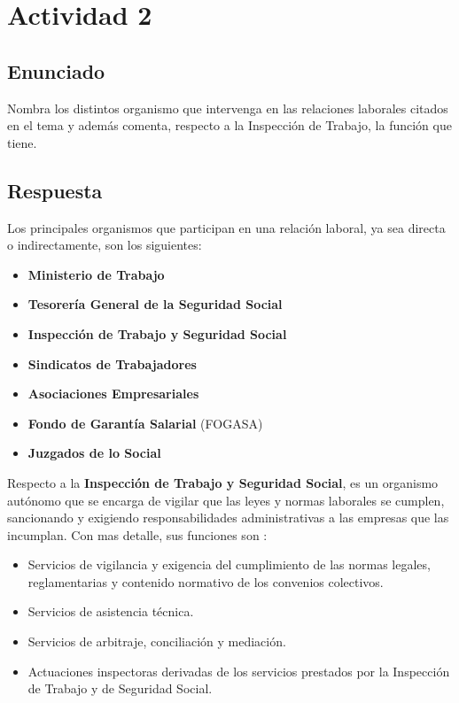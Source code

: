 \section{Actividad 2}

\subsection{Enunciado}
Nombra los distintos organismo que intervenga en las relaciones laborales citados en el tema y además comenta, respecto a la Inspección de Trabajo, la función que tiene.

\subsection{Respuesta}
Los principales organismos que participan en una relación laboral, ya sea directa o indirectamente, son los siguientes:

\begin{itemize}
    \item \textbf{Ministerio de Trabajo}
    \item \textbf{Tesorería General de la Seguridad Social}
    \item \textbf{Inspección de Trabajo y Seguridad Social}
    \item \textbf{Sindicatos de Trabajadores}
    \item \textbf{Asociaciones Empresariales}
    \item \textbf{Fondo de Garantía Salarial} (FOGASA)
    \item \textbf{Juzgados de lo Social}
\end{itemize}

Respecto a la \textbf{Inspección de Trabajo y Seguridad Social}, es un organismo autónomo que se encarga de vigilar que las leyes y normas laborales se cumplen, sancionando y exigiendo responsabilidades administrativas a las empresas que las incumplan. Con mas detalle, sus funciones son \cite{itss}:

\begin{itemize}
    \item Servicios de vigilancia y exigencia del cumplimiento de las normas legales, reglamentarias y contenido normativo de los convenios colectivos.
    \item Servicios de asistencia técnica.
    \item Servicios de arbitraje, conciliación y mediación.
    \item Actuaciones inspectoras derivadas de los servicios prestados por la Inspección de Trabajo y de Seguridad Social.
\end{itemize}

